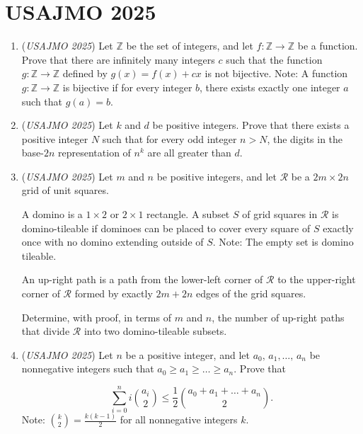 \section{USAJMO 2025}
        \begin{enumerate}
        	\item (\textit{USAJMO 2025}) Let $\mathbb Z$ be the set of integers, and let $f\colon \mathbb Z \to \mathbb Z$ be a function. Prove that there are infinitely many integers $c$ such that the function $g\colon \mathbb Z \to \mathbb Z$ defined by $g(x) = f(x) + cx$ is not bijective.
Note: A function $g\colon \mathbb Z \to \mathbb Z$ is bijective if for every integer $b$, there exists exactly one integer $a$ such that $g(a) = b$.


 

	\item (\textit{USAJMO 2025}) Let $k$ and $d$ be positive integers. Prove that there exists a positive integer $N$ such that for every odd integer $n>N$, the digits in the base-$2n$ representation of $n^k$ are all greater than $d$.


 

	\item (\textit{USAJMO 2025}) Let $m$ and $n$ be positive integers, and let $\mathcal R$ be a $2m\times 2n$ grid of unit squares.


 A domino is a $1\times2$ or $2\times1$ rectangle. A subset $S$ of grid squares in $\mathcal R$ is domino-tileable if dominoes can be placed to cover every square of $S$ exactly once with no domino extending outside of $S$. Note: The empty set is domino tileable.


 An up-right path is a path from the lower-left corner of $\mathcal R$ to the upper-right corner of $\mathcal R$ formed by exactly $2m+2n$ edges of the grid squares.


 Determine, with proof, in terms of $m$ and $n$, the number of up-right paths that divide $\mathcal R$ into two domino-tileable subsets.


 

	\item (\textit{USAJMO 2025}) Let $n$ be a positive integer, and let $a_0,\,a_1,\dots,\,a_n$ be nonnegative integers such that $a_0\ge a_1\ge \dots\ge a_n.$ Prove that

 \[\sum_{i=0}^n i\binom{a_i}{2}\le\frac{1}{2}\binom{a_0+a_1+\dots+a_n}{2}.\]
Note: $\binom{k}{2}=\frac{k(k-1)}{2}$ for all nonnegative integers $k$.


 


\end{enumerate}
